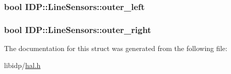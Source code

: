 \hypertarget{structIDP_1_1LineSensors_51c88077f39fead3a34ef115bdcdc7f1}{
\subsubsection[{outer\_\-left}]{\setlength{\rightskip}{0pt plus 5cm}bool {\bf IDP::LineSensors::outer\_\-left}}}
\label{structIDP_1_1LineSensors_51c88077f39fead3a34ef115bdcdc7f1}


\hypertarget{structIDP_1_1LineSensors_73f08dd5931bdc244d94f578f7dd0a17}{
\subsubsection[{outer\_\-right}]{\setlength{\rightskip}{0pt plus 5cm}bool {\bf IDP::LineSensors::outer\_\-right}}}
\label{structIDP_1_1LineSensors_73f08dd5931bdc244d94f578f7dd0a17}




The documentation for this struct was generated from the following file:\begin{CompactItemize}
\item 
libidp/\hyperlink{hal_8h}{hal.h}\end{CompactItemize}
